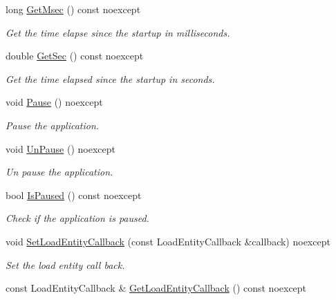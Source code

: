 \begin{DoxyCompactItemize}
long \hyperlink{class_blade_1_1_application_a0fd401f7a7ea78a8d222ccc920cb1968}{Get\+Msec} () const noexcept
\begin{DoxyCompactList}\small\item\em Get the time elapse since the startup in milliseconds. \end{DoxyCompactList}\item 
double \hyperlink{class_blade_1_1_application_a025118e872031944df57560e820cfde2}{Get\+Sec} () const noexcept
\begin{DoxyCompactList}\small\item\em Get the time elapsed since the startup in seconds. \end{DoxyCompactList}\item 
\mbox{\label{class_blade_1_1_application_a3c8f0f5698682bd2b205ae1616020073}} 
void \hyperlink{class_blade_1_1_application_a3c8f0f5698682bd2b205ae1616020073}{Pause} () noexcept
\begin{DoxyCompactList}\small\item\em Pause the application. \end{DoxyCompactList}\item 
\mbox{\label{class_blade_1_1_application_ab8626a9bc16bffa5d94d2e5851e378a2}} 
void \hyperlink{class_blade_1_1_application_ab8626a9bc16bffa5d94d2e5851e378a2}{Un\+Pause} () noexcept
\begin{DoxyCompactList}\small\item\em Un pause the application. \end{DoxyCompactList}\item 
bool \hyperlink{class_blade_1_1_application_a80cb2abe5d175dde76be4f461bd82183}{Is\+Paused} () const noexcept
\begin{DoxyCompactList}\small\item\em Check if the application is paused. \end{DoxyCompactList}\item 
void \hyperlink{class_blade_1_1_application_a328d42f7cb14a418ad3b9c54aa055132}{Set\+Load\+Entity\+Callback} (const Load\+Entity\+Callback \&callback) noexcept
\begin{DoxyCompactList}\small\item\em Set the load entity call back. \end{DoxyCompactList}\item 
const Load\+Entity\+Callback \& \hyperlink{class_blade_1_1_application_ac5964be32df8e0787b832896c0811ae6}{Get\+Load\+Entity\+Callback} () const noexcept

\end{DoxyCompactItemize}

